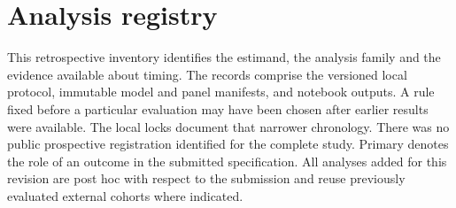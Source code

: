 \section{Analysis registry}
\label{sec:registry}
This retrospective inventory identifies the estimand, the analysis family and the evidence available about timing. The records comprise the versioned local protocol, immutable model and panel manifests, and notebook outputs. A rule fixed before a particular evaluation may have been chosen after earlier results were available. The local locks document that narrower chronology. There was no public prospective registration identified for the complete study. Primary denotes the role of an outcome in the submitted specification. All analyses added for this revision are post hoc with respect to the submission and reuse previously evaluated external cohorts where indicated.

